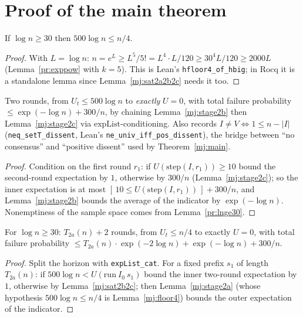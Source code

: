 \section{Proof of the main theorem}\label{mj:sec:proof-main}

\begin{lemma}\label{mj:floor4}
  \rocqok
  If $\log n \ge 30$ then $500 \log n \le n/4$.
\end{lemma}
\begin{proof}
  \rocqok
  With $L = \log n$: $n = e^L \ge L^5/5! = L^4 \cdot L/120 \ge
  30^4 L / 120 \ge 2000 L$ (Lemma~\ref{pr:exppow} with $k = 5$). This is
  Lean's \texttt{hfloor4\_of\_hbig}; in Rocq it is a standalone lemma since
  Lemma~\ref{mj:sat2a2b2c} needs it too.
\end{proof}

\begin{lemma}\label{mj:sat2b2c}
  \rocqok
  Two rounds, from $U_t\le500\log n$ to \emph{exactly} $U=0$, with total
  failure probability $\le\exp(-\log n)+300/n$, by chaining
  Lemma~\ref{mj:stage2b} then Lemma~\ref{mj:stage2c} via
  $\mathrm{expList}$-conditioning. Also records
  $I \ne V \iff 1 \le n - |I|$ (\texttt{neq\_setT\_dissent}, Lean's
  \texttt{ne\_univ\_iff\_pos\_dissent}), the bridge between ``no consensus''
  and ``positive dissent'' used by Theorem~\ref{mj:main}.
\end{lemma}
\begin{proof}
  \rocqok
  Condition on the first round $r_1$: if $U(\mathrm{step}(I,r_1)) \ge 10$
  bound the second-round expectation by $1$, otherwise by $300/n$
  (Lemma~\ref{mj:stage2c}); so the inner expectation is at most
  $[\,10 \le U(\mathrm{step}(I, r_1))\,] + 300/n$, and
  Lemma~\ref{mj:stage2b} bounds the average of the indicator by
  $\exp(-\log n)$. Nonemptiness of the sample space comes from
  Lemma~\ref{pr:lnge30}.
\end{proof}

\begin{lemma}\label{mj:sat2a2b2c}
  \rocqok
  For $\log n \ge 30$: $T_{2a}(n)+2$ rounds, from $U_t\le n/4$ to exactly
  $U=0$, with total failure probability
  $\le T_{2a}(n)\cdot \exp(-2\log n) + \exp(-\log n) + 300/n$.
\end{lemma}
\begin{proof}
  \rocqok
  Split the horizon with \texttt{expList\_cat}. For a fixed prefix $s_1$ of
  length $T_{2a}(n)$: if $500\log n < U(\mathrm{run}\ I_0\ s_1)$ bound the
  inner two-round expectation by $1$, otherwise by Lemma~\ref{mj:sat2b2c};
  then Lemma~\ref{mj:stage2a} (whose hypothesis $500\log n \le n/4$ is
  Lemma~\ref{mj:floor4}) bounds the outer expectation of the indicator.
\end{proof}

